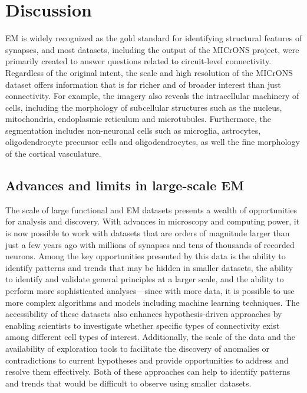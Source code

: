 \documentclass{article}
\begin{document}
\section*{Discussion}

EM is widely recognized as the gold standard for identifying structural features of synapses, and most datasets, including the output of the MICrONS project, were primarily created to answer questions related to circuit-level connectivity. Regardless of the original intent, the scale and high resolution of the MICrONS dataset offers information that is far richer and of broader interest than just connectivity. For example, the imagery also reveals the intracellular machinery of cells, including the morphology of subcellular structures such as the nucleus, mitochondria, endoplasmic reticulum and microtubules. Furthermore, the segmentation includes non-neuronal cells such as microglia, astrocytes, oligodendrocyte precursor cells and oligodendrocytes, as well the fine morphology of the cortical vasculature.

\subsection*{Advances and limits in large-scale EM}

The scale of large functional and EM datasets presents a wealth of opportunities for analysis and discovery. With advances in microscopy and computing power, it is now possible to work with datasets that are orders of magnitude larger than just a few years ago with millions of synapses and tens of thousands of recorded neurons. Among the key opportunities presented by this data is the ability to identify patterns and trends that may be hidden in smaller datasets, the ability to identify and validate general principles at a larger scale, and the ability to perform more sophisticated analyses—since with more data, it is possible to use more complex algorithms and models including machine learning techniques. The accessibility of these datasets also enhances hypothesis-driven approaches by enabling scientists to investigate whether specific types of connectivity exist among different cell types of interest. Additionally, the scale of the data and the availability of exploration tools to facilitate the discovery of anomalies or contradictions to current hypotheses and provide opportunities to address and resolve them effectively. Both of these approaches can help to identify patterns and trends that would be difficult to observe using smaller datasets.
\end{document}
